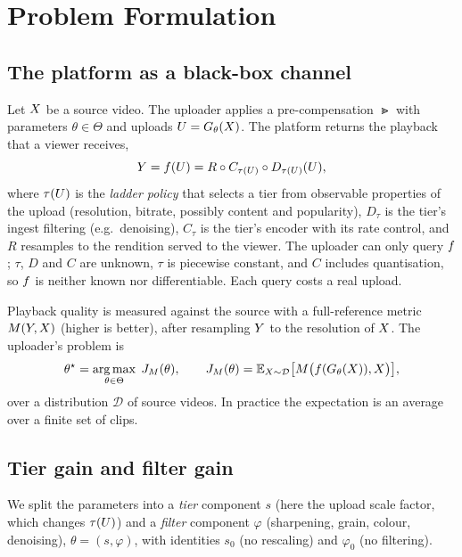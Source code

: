 \section{Problem Formulation}
\label{sec:problem}

\subsection{The platform as a black-box channel}

Let $X$ be a source video. The uploader applies a pre-compensation $\Gt$ with parameters
$\theta\in\Theta$ and uploads $U=G_{\theta}(X)$. The platform returns the playback that a viewer receives,
\begin{equation}
  Y = f(U) = R \circ C_{\tau(U)} \circ D_{\tau(U)}(U),
  \label{eq:platform}
\end{equation}
where $\tau(U)$ is the \emph{ladder policy} that selects a tier from observable properties of the
upload (resolution, bitrate, possibly content and popularity), $D_\tau$ is the tier's ingest
filtering (e.g.\ denoising), $C_\tau$ is the tier's encoder with its rate control, and $R$ resamples
to the rendition served to the viewer. The uploader can only query $f$; $\tau$, $D$ and $C$ are
unknown, $\tau$ is piecewise constant, and $C$ includes quantisation, so $f$ is neither known nor
differentiable. Each query costs a real upload.

Playback quality is measured against the source with a full-reference metric $M(Y,X)$ (higher is
better), after resampling $Y$ to the resolution of $X$. The uploader's problem is
\begin{equation}
  \theta^\star = \operatorname*{arg\,max}_{\theta\in\Theta}\; J_M(\theta),\qquad
  J_M(\theta) = \mathbb{E}_{X\sim\mathcal{D}}\big[M\big(f(G_{\theta}(X)),X\big)\big],
  \label{eq:objective}
\end{equation}
over a distribution $\mathcal{D}$ of source videos. In practice the expectation is an average over a
finite set of clips.

\subsection{Tier gain and filter gain}

We split the parameters into a \emph{tier} component $s$ (here the upload scale factor, which
changes $\tau(U)$) and a \emph{filter} component $\varphi$ (sharpening, grain, colour, denoising),
$\theta=(s,\varphi)$, with identities $s_0$ (no rescaling) and $\varphi_0$ (no filtering).

